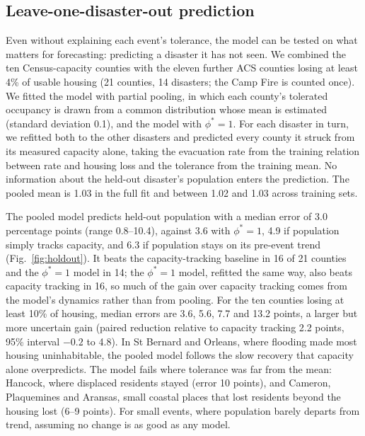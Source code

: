 \documentclass[11pt]{article}
\begin{document}
\subsection{Leave-one-disaster-out prediction}
Even without explaining each event's tolerance, the model can be tested on what matters for forecasting: predicting a disaster it has not seen. We combined the ten Census-capacity counties with the eleven further ACS counties losing at least 4\% of usable housing (21 counties, 14 disasters; the Camp Fire is counted once). We fitted the model with partial pooling, in which each county's tolerated occupancy is drawn from a common distribution whose mean is estimated (standard deviation 0.1), and the model with $\phi^*=1$. For each disaster in turn, we refitted both to the other disasters and predicted every county it struck from its measured capacity alone, taking the evacuation rate from the training relation between rate and housing loss and the tolerance from the training mean. No information about the held-out disaster's population enters the prediction. The pooled mean is 1.03 in the full fit and between 1.02 and 1.03 across training sets.

The pooled model predicts held-out population with a median error of 3.0 percentage points (range 0.8--10.4), against 3.6 with $\phi^*=1$, 4.9 if population simply tracks capacity, and 6.3 if population stays on its pre-event trend (Fig.~\ref{fig:holdout}). It beats the capacity-tracking baseline in 16 of 21 counties and the $\phi^*=1$ model in 14; the $\phi^*=1$ model, refitted the same way, also beats capacity tracking in 16, so much of the gain over capacity tracking comes from the model's dynamics rather than from pooling. For the ten counties losing at least 10\% of housing, median errors are 3.6, 5.6, 7.7 and 13.2 points, a larger but more uncertain gain (paired reduction relative to capacity tracking 2.2 points, 95\% interval $-0.2$ to 4.8). In St Bernard and Orleans, where flooding made most housing uninhabitable, the pooled model follows the slow recovery that capacity alone overpredicts. The model fails where tolerance was far from the mean: Hancock, where displaced residents stayed (error 10 points), and Cameron, Plaquemines and Aransas, small coastal places that lost residents beyond the housing lost (6--9 points). For small events, where population barely departs from trend, assuming no change is as good as any model.
\end{document}
